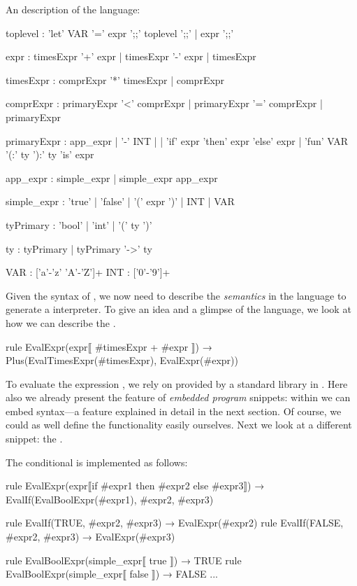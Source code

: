 \begin{example} \label{ex:MiniML} %
  An \antlr description of the \MiniML language:
\begin{lstANTLR}
toplevel : 'let' VAR '=' expr ';;' toplevel ';;'
            | expr ';;'

expr : timesExpr '+' expr | timesExpr '-' expr
       | timesExpr

timesExpr : comprExpr '*' timesExpr | comprExpr

comprExpr : primaryExpr '<' comprExpr
           | primaryExpr '=' comprExpr
           | primaryExpr

primaryExpr : app_expr | '-' INT |
             | 'if' expr 'then' expr 'else' expr
             | 'fun' VAR '(:' ty '):' ty 'is' expr

app_expr : simple_expr | simple_expr app_expr      

simple_expr : 'true' | 'false' | '(' expr ')' 
             | INT |  VAR 

tyPrimary : 'bool' | 'int' | '(' ty ')'

ty : tyPrimary | tyPrimary '->' ty

VAR : ['a'-'z' 'A'-'Z']+
INT : ['0'-'9']+
\end{lstANTLR}
\end{example}
%
Given the syntax of \MiniML, we now need to describe the
\emph{semantics} in the \Tosca language to generate a \MiniML
interpreter. To give an idea and a glimpse of the \Tosca
language, we look at how we can describe the .
%
\begin{lstTosca}
rule EvalExpr(expr⟦ #timesExpr + #expr ⟧) 
  → Plus(EvalTimesExpr(#timesExpr), EvalExpr(#expr))
\end{lstTosca}
%
To evaluate the expression , we rely on
 provided by a standard library in \Tosca. Here also we
already present the feature of \emph{embedded program} snippets:
within  we can embed \MiniML syntax---a feature
explained in detail in the next section.  Of course, we could as well
define the functionality easily ourselves. Next we look at a different
snippet: the .
%
\begin{example} \label{ex:evalminiml} 
The conditional  is implemented as follows:

\begin{lstTosca}
rule EvalExpr(expr⟦if #expr1 then #expr2 else #expr3⟧) 
  → EvalIf(EvalBoolExpr(#expr1), #expr2, #expr3)

rule EvalIf(TRUE, #expr2, #expr3) → EvalExpr(#expr2)
rule EvalIf(FALSE, #expr2, #expr3) → EvalExpr(#expr3)

rule EvalBoolExpr(simple_expr⟦ true ⟧) → TRUE
rule EvalBoolExpr(simple_expr⟦ false ⟧) → FALSE
...
\end{lstTosca}
\end{example}

